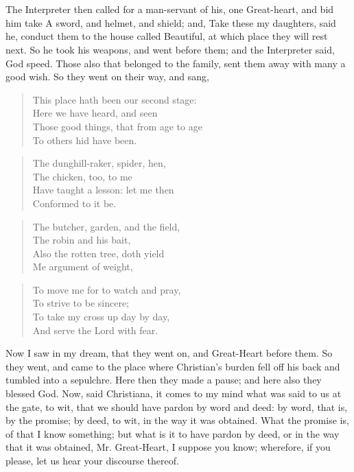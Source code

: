 \chapter[THE THIRD STAGE]{}

The Interpreter then called for a man-servant of his, one Great-heart, and bid him take A sword, and helmet, and shield; and, Take these my daughters, said he, conduct them to the house called Beautiful, at which place they will rest next. So he took his weapons, and went before them; and the Interpreter said, God speed. Those also that belonged to the family, sent them away with many a good wish. So they went on their way, and sang,
\begin{verse}
This place hath been our second stage:\\
Here we have heard, and seen\\
Those good things, that from age to age\\
To others hid have been.\\
\end{verse}
\begin{verse}
The dunghill-raker, spider, hen,\\
The chicken, too, to me\\
Have taught a lesson: let me then\\
Conformed to it be.\\
\end{verse}
\begin{verse}
The butcher, garden, and the field,\\
The robin and his bait,\\
Also the rotten tree, doth yield\\
Me argument of weight,\\
\end{verse}
\begin{verse}
To move me for to watch and pray,\\
To strive to be sincere;\\
To take my cross up day by day,\\
And serve the Lord with fear.\\
\end{verse}
Now I saw in my dream, that they went on, and Great-Heart before them. So they went, and came to the place where Christian's burden fell off his back and tumbled into a sepulchre. Here then they made a pause; and here also they blessed God. Now, said Christiana, it comes to my mind what was said to us at the gate, to wit, that we should have pardon by word and deed: by word, that is, by the promise; by deed, to wit, in the way it was obtained. What the promise is, of that I know something; but what is it to have pardon by deed, or in the way that it was obtained, Mr. Great-Heart, I suppose you know; wherefore, if you please, let us hear your discourse thereof.

